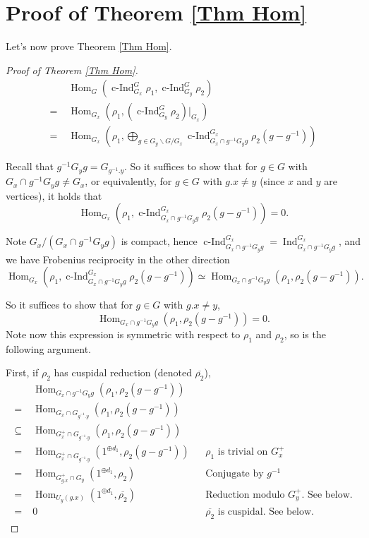 \documentclass{article}
\DeclareMathOperator{\cInd}{\operatorname{c-Ind}}
\newcommand{\Hom}{\operatorname{Hom}}
\begin{document}
	




	
	
	
	
	\section{Proof of Theorem \ref{Thm Hom}}\label{Sec Pf Thm Hom}
	
	Let's now prove Theorem \ref{Thm Hom}.
	
	\begin{proof}[Proof of Theorem \ref{Thm Hom}]
		\begin{equation*}
			\begin{aligned}
				&\Hom_G(\cInd_{G_x}^G\rho_1, \cInd_{G_y}^G\rho_2)\\
				=\;&\Hom_{G_x}\left(\rho_1,(\cInd_{G_y}^G\rho_2)|_{G_x}\right)\\
				=\;& \Hom_{G_x}\left(\rho_1, \bigoplus_{g \in {G_y\backslash G/G_x}}\cInd_{G_x \cap g^{-1}G_yg}^{G_x}\rho_2(g-g^{-1})\right)
			\end{aligned}
		\end{equation*}
		
		Recall that $g^{-1}G_yg=G_{g^{-1}.y}$. So it suffices to show that for $g \in G$ with $G_x \cap g^{-1}G_yg \neq G_x$, or equivalently, for $g 
		\in G$ with $g.x \neq y$ (since $x$ and $y$ are vertices), it holds that
		$$\Hom_{G_x}\left(\rho_1, \cInd_{G_x \cap g^{-1}G_yg}^{G_x}\rho_2(g-g^{-1})\right)=0.$$
		
		Note $G_x/(G_x \cap g^{-1}G_yg)$ is compact, hence $\cInd_{G_x \cap g^{-1}G_yg}^{G_x}=\operatorname{Ind}_{G_x \cap g^{-1}G_yg}^{G_x}$, and we have Frobenius reciprocity in the other direction
		$$\Hom_{G_x}\left(\rho_1, \cInd_{G_x \cap g^{-1}G_yg}^{G_x}\rho_2(g-g^{-1})\right) \simeq \Hom_{G_x \cap g^{-1}G_yg}\left(\rho_1, \rho_2(g-g^{-1})\right).$$
		
		So it suffices to show that for $g \in G$ with $g.x \neq y$,
		$$\Hom_{G_x \cap g^{-1}G_yg}\left(\rho_1, \rho_2(g-g^{-1})\right)=0.$$
		Note now this expression is symmetric with respect to $\rho_1$ and $\rho_2$, so is the following argument.
		
		First, if $\rho_2$ has cuspidal reduction (denoted $\overline{\rho_2}$),
		\begin{align*}    	
			& \Hom_{G_x \cap g^{-1}G_yg}\left(\rho_1, \rho_2(g-g^{-1})\right) \\
			=\;& \Hom_{G_x \cap G_{g^{-1}.y}}\left(\rho_1, \rho_2(g-g^{-1})\right) \\
			\subseteq\;& \Hom_{G_x^+ \cap G_{g^{-1}.y}}\left(\rho_1, \rho_2(g-g^{-1})\right) && %
			\\
			=\;& \Hom_{G_x^+ \cap G_{g^{-1}.y}}(1^{\oplus d_1}, \rho_2(g-g^{-1})) && \text{$\rho_1$ is trivial on $G_x^+$ }\\
			=\;& \Hom_{G_{g.x}^+ \cap G_y}(1^{\oplus d_1}, \rho_2) && \text{Conjugate by $g^{-1}$}\\
			=\;& \Hom_{U_y(g.x)}(1^{\oplus d_1}, \overline{\rho_2}) && \text{Reduction modulo $G_y^+$. See below.}\\
			=\;& 0 && \text{$\overline{\rho_2}$ is cuspidal. See below.}
		\end{align*}
		

\end{proof}
\end{document}
